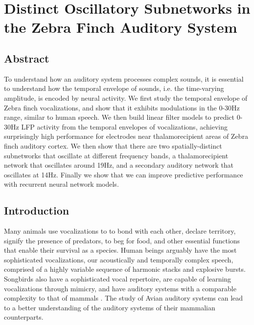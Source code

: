 \chapter{Distinct Oscillatory Subnetworks in the Zebra Finch Auditory System}

\section{Abstract}
To understand how an auditory system processes complex sounds, it is essential to understand how the temporal envelope of sounds, i.e. the time-varying amplitude, is encoded by neural activity. We first study the temporal envelope of Zebra finch vocalizations, and show that it exhibits modulations in the 0-30Hz range, similar to human speech. We then build linear filter models to predict 0-30Hz LFP activity from the temporal envelopes of vocalizations, achieving surprisingly high performance for electrodes near thalamorecipient areas of Zebra finch auditory cortex. We then show that there are two spatially-distinct subnetworks that oscillate at different frequency bands, a thalamorecipient network that oscillates around 19Hz, and a secondary auditory network that oscillates at 14Hz. Finally we show that we can improve predictive performance with recurrent neural network models.

\section{Introduction}

Many animals use vocalizations to to bond with each other, declare territory, signify the presence of predators, to beg for food, and other essential functions that enable their survival as a species. Human beings arguably have the most sophisticated vocalizations, our acoustically and temporally complex speech, comprised of a highly variable sequence of harmonic stacks and explosive bursts. Songbirds also have a sophisticated vocal repertoire, are capable of learning vocalizations through mimicry, and have auditory systems with a comparable complexity to that of mammals \cite{Brainard2013}. The study of Avian auditory systems can lead to a better understanding of the auditory systems of their mammalian counterparts.

